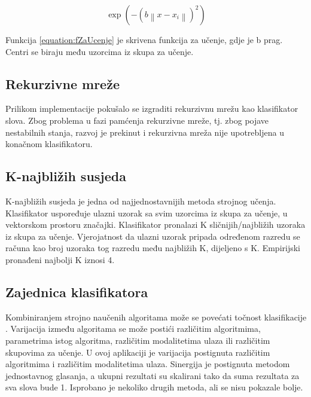\documentclass[a4paper,twocolumn,dvipdfm]{article}
\begin{document}
\begin{equation}
\exp(-\left (b \left \| x - x_{i} \right \|  \right )^{2})
\label{equation:fZaUcenje}
\end{equation}

Funkcija \ref{equation:fZaUcenje} je skrivena funkcija za učenje, gdje je b
prag. Centri se biraju među uzorcima iz skupa za učenje.




\subsection{Rekurzivne mreže}
Prilikom implementacije pokušalo se izgraditi rekurzivnu mrežu kao klasifikator slova. 
Zbog problema u fazi pamćenja rekurzivne mreže, tj. zbog pojave nestabilnih stanja, 
razvoj je prekinut i rekurzivna mreža nije upotrebljena u konačnom klasifikatoru.

\subsection{K-najbližih susjeda}
K-najbližih susjeda je jedna od najjednostavnijih metoda strojnog učenja. 
Klasifikator uspoređuje ulazni uzorak sa svim uzorcima iz skupa za učenje, 
u vektorskom prostoru značajki. Klasifikator pronalazi K sličnijih/najbližih 
uzoraka iz skupa za učenje. Vjerojatnost da ulazni uzorak pripada određenom 
razredu se računa kao broj uzoraka tog razredu među najbližih K, dijeljeno s K. 
Empirijski pronađeni najbolji K iznosi 4.

\subsection{Zajednica klasifikatora}
Kombiniranjem strojno naučenih algoritama može se povećati točnost
klasifikacije \cite{alpaydin2004introduction}. Varijacija između algoritama se
može postići različitim algoritmima, parametrima istog algoritma, različitim
modalitetima ulaza ili različitim skupovima za učenje. U ovoj aplikaciji je
varijacija postignuta različitim algoritmima i različitim modalitetima ulaza.
Sinergija je postignuta metodom jednostavnog glasanja, a ukupni rezultati su
skalirani tako da suma rezultata za sva slova bude 1. Isprobano je nekoliko
drugih metoda, ali se nisu pokazale bolje.
\end{document}
